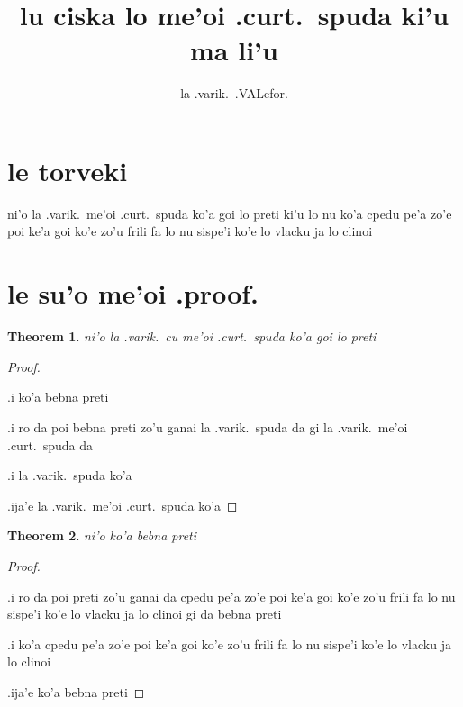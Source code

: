 \documentclass{article}
\title{lu ciska lo me'oi .curt.\ spuda ki'u ma li'u}
\author{la .varik.\ .VALefor.}
\begin{document}
\newtheorem{thm}{Theorem}
\maketitle

\section{le torveki}
ni'o la .varik.\ me'oi .curt.\ spuda ko'a goi lo preti ki'u lo nu ko'a cpedu pe'a zo'e poi ke'a goi ko'e zo'u frili fa lo nu sispe'i ko'e lo vlacku ja lo clinoi

\section{le su'o me'oi .proof.}
\begin{thm}
	ni'o la .varik.\ cu me'oi .curt.\ spuda ko'a goi lo preti
\end{thm}
\begin{proof}
	${}$

	.i ko'a bebna preti

	.i ro da poi bebna preti zo'u ganai la .varik.\ spuda da gi la .varik.\ me'oi .curt.\ spuda da

	.i la .varik.\ spuda ko'a

	.ija'e la .varik.\ me'oi .curt.\ spuda ko'a
\end{proof}

\begin{thm}
	ni'o ko'a bebna preti
\end{thm}
\begin{proof}
	${}$

	.i ro da poi preti zo'u ganai da cpedu pe'a zo'e poi ke'a goi ko'e zo'u frili fa lo nu sispe'i ko'e lo vlacku ja lo clinoi gi da bebna preti

	.i ko'a cpedu pe'a zo'e poi ke'a goi ko'e zo'u frili fa lo nu sispe'i ko'e lo vlacku ja lo clinoi

	.ija'e ko'a bebna preti
\end{proof}
\end{document}
